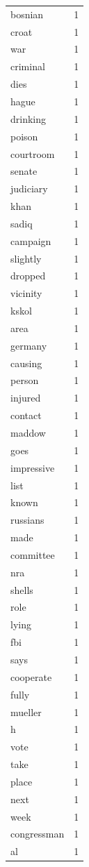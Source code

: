 \begin{tabular}{lr}
bosnian & 1 \\
croat & 1 \\
war & 1 \\
criminal & 1 \\
dies & 1 \\
hague & 1 \\
drinking & 1 \\
poison & 1 \\
courtroom & 1 \\
senate & 1 \\
judiciary & 1 \\
khan & 1 \\
sadiq & 1 \\
campaign & 1 \\
slightly & 1 \\
dropped & 1 \\
vicinity & 1 \\
kskol & 1 \\
area & 1 \\
germany & 1 \\
causing & 1 \\
person & 1 \\
injured & 1 \\
contact & 1 \\
maddow & 1 \\
goes & 1 \\
impressive & 1 \\
list & 1 \\
known & 1 \\
russians & 1 \\
made & 1 \\
committee & 1 \\
nra & 1 \\
shells & 1 \\
role & 1 \\
lying & 1 \\
fbi & 1 \\
says & 1 \\
cooperate & 1 \\
fully & 1 \\
mueller & 1 \\
h & 1 \\
vote & 1 \\
take & 1 \\
place & 1 \\
next & 1 \\
week & 1 \\
congressman & 1 \\
al & 1 \\

\end{tabular}
